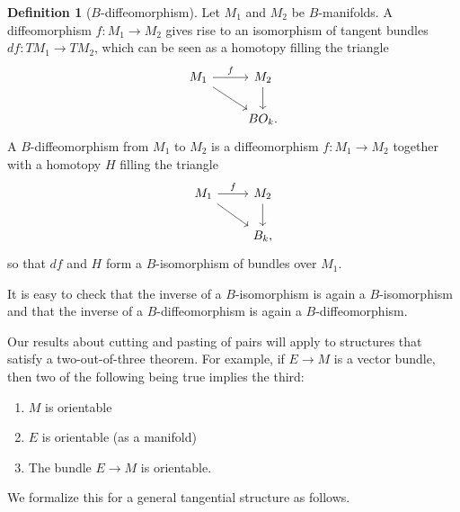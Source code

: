 \documentclass{amsart}
\theoremstyle{definition}
\newtheorem{defi}[thm]{Definition}
\theoremstyle{remark}
\begin{document}
\begin{defi}[$B$-diffeomorphism]
    Let $M_1$ and $M_2$ be $B$-manifolds. A diffeomorphism $f:M_1\to M_2$ gives rise to an isomorphism of tangent bundles $df:TM_1\to TM_2$, which can be seen as a homotopy filling the triangle
    \[\begin{tikzcd}
M_1 \arrow[r, "f"] \arrow[rd] & M_2 \arrow[d] \\
                              & BO_k   .      
\end{tikzcd}\]
    A $B$-diffeomorphism from $M_1$ to $M_2$ is a diffeomorphism $f:M_1\to M_2$ together with a homotopy $H$ filling the triangle
    \[\begin{tikzcd}
M_1 \arrow[r, "f"] \arrow[rd] & M_2 \arrow[d] \\
                              & B_k    ,      
\end{tikzcd}\]
    so that $df$ and $H$ form a $B$-isomorphism of bundles over $M_1$.
\end{defi}

It is easy to check that the inverse of a $B$-isomorphism is again a $B$-isomorphism and that the inverse of a $B$-diffeomorphism is again a $B$-diffeomorphism.

Our results about cutting and pasting of pairs will apply to structures that satisfy a two-out-of-three theorem. For example, if $E\to M$ is a vector bundle, then two of the following being true implies the third: 
\begin{enumerate}
    \item $M$ is orientable
    \item $E$ is orientable (as a manifold)
    \item The bundle $E\to M$ is orientable.
\end{enumerate}
We formalize this for a general tangential structure as follows.

\end{document}
